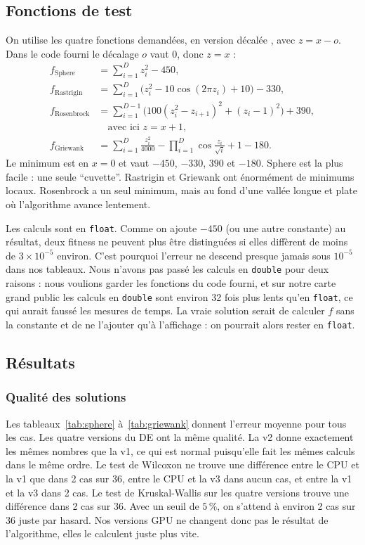 \documentclass[conference]{IEEEtran}
\begin{document}
\subsection{Fonctions de test}
On utilise les quatre fonctions demand\'ees, en version d\'ecal\'ee \cite{suganthan}, avec $z=x-o$. Dans le code fourni le d\'ecalage $o$ vaut 0, donc $z=x$ :
\begin{align*}
f_{\mathrm{Sphere}}&=\sum_{i=1}^{D}z_i^2-450,\\
f_{\mathrm{Rastrigin}}&=\sum_{i=1}^{D}\bigl(z_i^2-10\cos(2\pi z_i)+10\bigr)-330,\\
f_{\mathrm{Rosenbrock}}&=\sum_{i=1}^{D-1}\bigl(100(z_i^2-z_{i+1})^2+(z_i-1)^2\bigr)+390,\\
&\quad\text{avec ici } z=x+1,\\
f_{\mathrm{Griewank}}&=\sum_{i=1}^{D}\frac{z_i^2}{4000}-\prod_{i=1}^{D}\cos\frac{z_i}{\sqrt{i}}+1-180.
\end{align*}
Le minimum est en $x=0$ et vaut $-450$, $-330$, $390$ et $-180$. Sphere est la plus facile : une seule ``cuvette''. Rastrigin et Griewank ont \'enorm\'ement de minimums locaux. Rosenbrock a un seul minimum, mais au fond d'une vall\'ee longue et plate o\`u l'algorithme avance lentement.

Les calculs sont en \texttt{float}. Comme on ajoute $-450$ (ou une autre constante) au r\'esultat, deux fitness ne peuvent plus \^etre distingu\'ees si elles diff\`erent de moins de $3\times10^{-5}$ environ. C'est pourquoi l'erreur ne descend presque jamais sous $10^{-5}$ dans nos tableaux. Nous n'avons pas pass\'e les calculs en \texttt{double} pour deux raisons : nous voulions garder les fonctions du code fourni, et sur notre carte grand public les calculs en \texttt{double} sont environ 32 fois plus lents qu'en \texttt{float}, ce qui aurait fauss\'e les mesures de temps. La vraie solution serait de calculer $f$ sans la constante et de ne l'ajouter qu'\`a l'affichage : on pourrait alors rester en \texttt{float}.

\subsection{R\'esultats}

\subsubsection{Qualit\'e des solutions}
Les tableaux~\ref{tab:sphere} \`a~\ref{tab:griewank} donnent l'erreur moyenne pour tous les cas. Les quatre versions du DE ont la m\^eme qualit\'e. La v2 donne exactement les m\^emes nombres que la v1, ce qui est normal puisqu'elle fait les m\^emes calculs dans le m\^eme ordre. Le test de Wilcoxon ne trouve une diff\'erence entre le CPU et la v1 que dans 2 cas sur 36, entre le CPU et la v3 dans aucun cas, et entre la v1 et la v3 dans 2 cas. Le test de Kruskal-Wallis sur les quatre versions trouve une diff\'erence dans 2 cas sur 36. Avec un seuil de $5\,\%$, on s'attend \`a environ 2 cas sur 36 juste par hasard. Nos versions GPU ne changent donc pas le r\'esultat de l'algorithme, elles le calculent juste plus vite.
\end{document}
